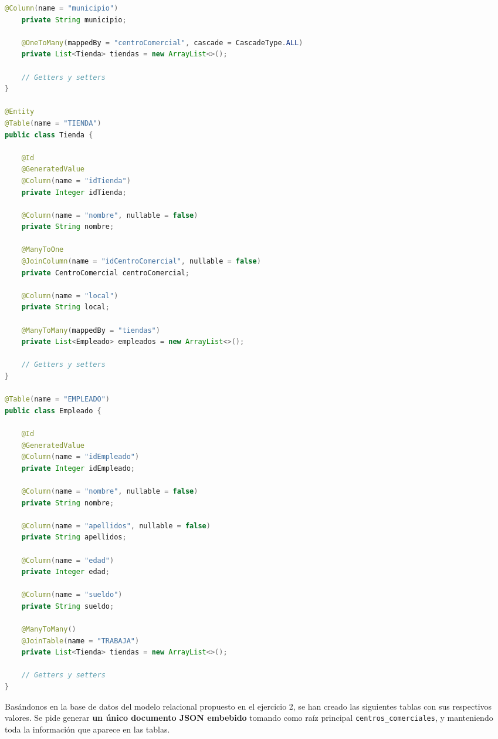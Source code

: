 \documentclass[
    12pt,
    a4paper,
    addpoints,
    answers,
    convocatoria=ord,
    titulacion=NoCD,
    curso=2024/2025,
]{db-exam}
\begin{document}
\begin{questions}
\begin{solution}
\begin{lstlisting}[language=Java]
    @Column(name = "municipio")
    private String municipio;

    @OneToMany(mappedBy = "centroComercial", cascade = CascadeType.ALL)
    private List<Tienda> tiendas = new ArrayList<>();

    // Getters y setters
}

@Entity
@Table(name = "TIENDA")
public class Tienda {

    @Id
    @GeneratedValue
    @Column(name = "idTienda")
    private Integer idTienda;

    @Column(name = "nombre", nullable = false)
    private String nombre;

    @ManyToOne
    @JoinColumn(name = "idCentroComercial", nullable = false)
    private CentroComercial centroComercial;

    @Column(name = "local")
    private String local;

    @ManyToMany(mappedBy = "tiendas")
    private List<Empleado> empleados = new ArrayList<>();

    // Getters y setters
}

@Table(name = "EMPLEADO")
public class Empleado {

    @Id
    @GeneratedValue
    @Column(name = "idEmpleado")
    private Integer idEmpleado;

    @Column(name = "nombre", nullable = false)
    private String nombre;

    @Column(name = "apellidos", nullable = false)
    private String apellidos;

    @Column(name = "edad")
    private Integer edad;

    @Column(name = "sueldo")
    private String sueldo;

    @ManyToMany()
    @JoinTable(name = "TRABAJA")
    private List<Tienda> tiendas = new ArrayList<>();

    // Getters y setters
}
\end{lstlisting}       
\end{solution}

\newpage
\question[\half] Basándonos en la base de datos del modelo relacional propuesto en el ejercicio 2, se han creado las siguientes tablas con sus respectivos valores. Se pide generar \textbf{un único documento JSON embebido} tomando como raíz principal \texttt{centros\_comerciales}, y manteniendo toda la información que aparece en las tablas.

\begin{table}[h!]
\centering
\small
\begin{tabular}{|p{4cm}|p{2.5cm}|p{2.5cm}|p{2cm}|p{2.5cm}|}


\end{tabular}
\end{table}
\end{questions}
\end{document}
